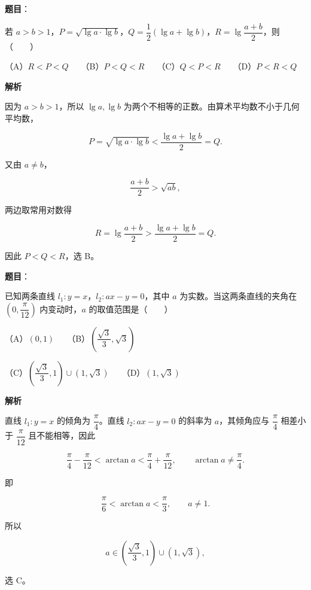 \begin{answer}

\textbf{题目}：

若 $a>b>1$，$P=\sqrt{\lg a\cdot\lg b}$，$Q=\dfrac12(\lg a+\lg b)$，$R=\lg\dfrac{a+b}{2}$，则\mbox{（　　）}

（A）$R<P<Q$　　（B）$P<Q<R$　　（C）$Q<P<R$　　（D）$P<R<Q$

\textbf{解析}

因为 $a>b>1$，所以 $\lg a,\lg b$ 为两个不相等的正数。由算术平均数不小于几何平均数，

\nopagebreak[4]
\[
P=\sqrt{\lg a\cdot\lg b}
<\frac{\lg a+\lg b}{2}=Q.
\]

又由 $a\ne b$，

\nopagebreak[4]
\[
\frac{a+b}{2}>\sqrt{ab},
\]

两边取常用对数得

\nopagebreak[4]
\[
R=\lg\frac{a+b}{2}
>\frac{\lg a+\lg b}{2}=Q.
\]

因此 $P<Q<R$，选 B。


\end{answer}
\begin{answer}

\textbf{题目}：

已知两条直线 $l_1:y=x$，$l_2:ax-y=0$，其中 $a$ 为实数。当这两条直线的夹角在 $\left(0,\dfrac\pi{12}\right)$ 内变动时，$a$ 的取值范围是\mbox{（　　）}

（A）$\left(0,1\right)$　　（B）$\left(\dfrac{\sqrt3}{3},\sqrt3\right)$

（C）$\left(\dfrac{\sqrt3}{3},1\right)\cup\left(1,\sqrt3\right)$　　（D）$\left(1,\sqrt3\right)$

\textbf{解析}

直线 $l_1:y=x$ 的倾角为 $\dfrac\pi4$。直线 $l_2:ax-y=0$ 的斜率为 $a$，其倾角应与 $\dfrac\pi4$ 相差小于 $\dfrac\pi{12}$ 且不能相等，因此

\nopagebreak[4]
\[
\frac\pi4-\frac\pi{12}<\arctan a<\frac\pi4+\frac\pi{12},
\qquad \arctan a\ne\frac\pi4.
\]

即

\nopagebreak[4]
\[
\frac\pi6<\arctan a<\frac\pi3,
\qquad a\ne1.
\]

所以

\nopagebreak[4]
\[
a\in\left(\frac{\sqrt3}{3},1\right)\cup(1,\sqrt3),
\]

选 C。


\end{answer}
